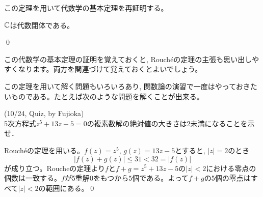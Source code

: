 この定理を用いて代数学の基本定理を再証明する。
\begin{cor}
$\mathbb{C}$は代数閉体である。
\end{cor}
\prf

\qed
\begin{tips}
この代数学の基本定理の証明を覚えておくと, Rouch\'{e}の定理の主張も思い出しやすくなります。両方を関連づけて覚えておくとよいでしょう。
\end{tips}

この定理を用いて解く問題もいろいろあり, 関数論の演習で一度はやっておきたいものである。たとえば次のような問題を解くことが出来る。
\begin{egprob} (10/24, Quiz, by Fujioka)\\
5次方程式$z^5+13z-5=0$の複素数解の絶対値の大きさは2未満になることを示せ．
\end{egprob}
\begin{egans} \label{egans:10/24_quiz_by_fujioka}
Rouch\'{e}の定理を用いる。$f(z) = z^{5}$, $g(z) = 13z -5$とすると, $|z| = 2$のとき
\[|f(z)+g(z)| \leq 31 < 32 = |f(z)|\]
が成り立つ。Roucheの定理より$f$と$f+g = z^{5} +13z - 5$の$|z|<2$における零点の個数は一致する。$f$が5重解$0$をもつから$5$個である。よって$f+g$の5個の零点はすべて$|z|<2$の範囲にある。\qed
\end{egans}




